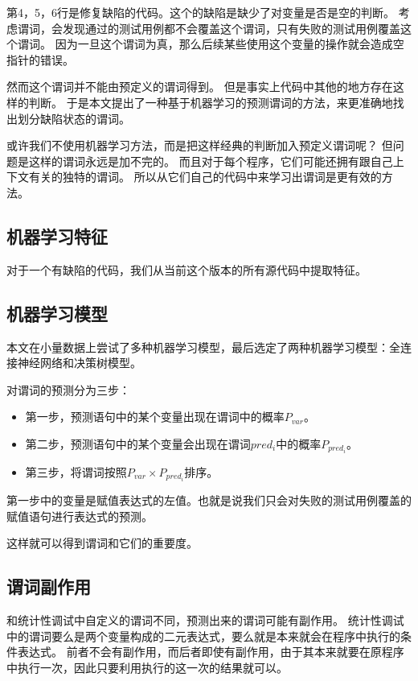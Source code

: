第4，5，6行是修复缺陷的代码。这个的缺陷是缺少了对变量是否是空的判断。
考虑谓词，会发现通过的测试用例都不会覆盖这个谓词，只有失败的测试用例覆盖这个谓词。
因为一旦这个谓词为真，那么后续某些使用这个变量的操作就会造成空指针的错误。

然而这个谓词并不能由预定义的谓词得到。
但是事实上代码中其他的地方存在这样的判断。
于是本文提出了一种基于机器学习的预测谓词的方法，来更准确地找出划分缺陷状态的谓词。

或许我们不使用机器学习方法，而是把这样经典的判断加入预定义谓词呢？
但问题是这样的谓词永远是加不完的。
而且对于每个程序，它们可能还拥有跟自己上下文有关的独特的谓词。
所以从它们自己的代码中来学习出谓词是更有效的方法。

\subsection{机器学习特征}

对于一个有缺陷的代码，我们从当前这个版本的所有源代码中提取特征。

\subsection{机器学习模型}

本文在小量数据上尝试了多种机器学习模型，最后选定了两种机器学习模型：全连接神经网络和决策树模型。

对谓词的预测分为三步：
\begin{itemize}
\item 第一步，预测语句中的某个变量出现在谓词中的概率$P_{var}$。
\item 第二步，预测语句中的某个变量会出现在谓词$pred_i$中的概率$P_{pred_i}$。
\item 第三步，将谓词按照$P_{var} \times P_{pred_i}$排序。
\end{itemize}

第一步中的变量是赋值表达式的左值。也就是说我们只会对失败的测试用例覆盖的赋值语句进行表达式的预测。

这样就可以得到谓词和它们的重要度。

\subsection{谓词副作用}

和统计性调试中自定义的谓词不同，预测出来的谓词可能有副作用。
统计性调试中的谓词要么是两个变量构成的二元表达式，要么就是本来就会在程序中执行的条件表达式。
前者不会有副作用，而后者即使有副作用，由于其本来就要在原程序中执行一次，因此只要利用执行的这一次的结果就可以。

